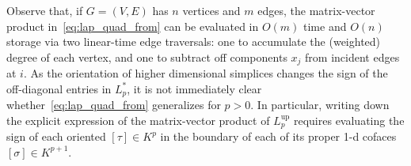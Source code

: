 \documentclass[10pt]{article}
\numberwithin{equation}{section}
\newcommand{\+}{%
	\raisebox{0.18ex}{\scaleobj{0.55}{+}}
}
\theoremstyle{definition}
\begin{document}
Observe that, if $G = (V, E)$ has $n$ vertices and $m$ edges, the matrix-vector product in~\eqref{eq:lap_quad_from} can be evaluated in $O(m)$ time and $O(n)$ storage via two linear-time edge traversals: one to accumulate the (weighted) degree of each vertex, and one to subtract off components $x_j$ from incident edges at $i$. 
As the orientation of higher dimensional simplices changes the sign of the off-diagonal entries in $L_p^\ast$, it is not immediately clear whether~\eqref{eq:lap_quad_from} generalizes for $p > 0$.
In particular, writing down the explicit expression of the matrix-vector product of $L_p^{\text{up}}$ requires  evaluating the sign of each oriented $[\tau] \in K^{p}$ in the boundary of each of its proper 1-d cofaces $[\sigma] \in K^{p+1}$. 
 
\end{document}
